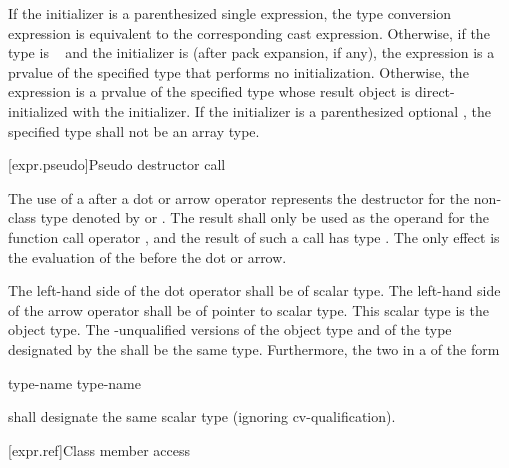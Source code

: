 \pnum
If the initializer is a parenthesized single expression,
the type conversion expression is equivalent
to the corresponding cast
expression.
%
Otherwise, if the type is \cv{}~
and the initializer is \tcode{()}
(after pack expansion, if any),
the expression is a prvalue of the specified type
that performs no initialization.
Otherwise,
the expression is a prvalue of the specified type
whose result object is direct-initialized
with the initializer.
If the initializer is a parenthesized optional ,
the specified type shall not be an array type.

[expr.pseudo]{Pseudo destructor call}

\pnum
{}%
%
%
The use of a  after a dot  or
arrow \tcode{->} operator represents the destructor for the non-class
type denoted by  or .
The result shall only be used as the
operand for the function call operator \tcode{()}, and the result of
such a call has type . The only effect is the evaluation of
the  before the dot or arrow.

\pnum
The left-hand side of the dot operator shall be of scalar type. The
left-hand side of the arrow operator shall be of pointer to scalar type.
This scalar type is the object type. The -unqualified
versions of the object type and of the type designated by the
 shall be the same type. Furthermore,
the two  in a  of
the form

\begin{ncbnf}
 type-name \terminal{::\,\~} type-name
\end{ncbnf}

shall designate the same scalar type (ignoring cv-qualification).

[expr.ref]{Class member access}

